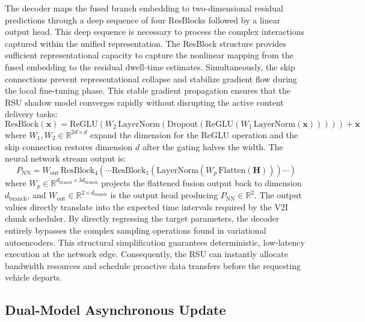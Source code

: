 \documentclass[journal]{IEEEtran}
\begin{document}
The decoder maps the fused branch embedding to two-dimensional residual predictions through a deep sequence of four ResBlocks followed by a linear output head.
This deep sequence is necessary to process the complex interactions captured within the unified representation.
The ResBlock structure provides sufficient representational capacity to capture the nonlinear mapping from the fused embedding to the residual dwell-time estimates.
Simultaneously, the skip connections prevent representational collapse and stabilize gradient flow during the local fine-tuning phase.
This stable gradient propagation ensures that the RSU shadow model converges rapidly without disrupting the active content delivery tasks:
\begin{equation}
\text{ResBlock}(\mathbf{x}) = \text{ReGLU}\!\left(W_2\, \text{LayerNorm}\!\left(\text{Dropout}\!\left(\text{ReGLU}(W_1\, \text{LayerNorm}(\mathbf{x}))\right)\right)\right) + \mathbf{x}
\label{eq:resblock}
\end{equation}
where $W_1, W_2 \in \mathbb{R}^{2d \times d}$ expand the dimension for the ReGLU operation and the skip connection restores dimension $d$ after the gating halves the width.
The neural network stream output is:
\begin{equation}
P_\text{NN} = W_\text{out}\, \text{ResBlock}_4\!\left(\cdots \text{ResBlock}_1\!\left(\text{LayerNorm}(W_p\, \text{Flatten}(\mathbf{H}))\right)\cdots\right)
\label{eq:decoder}
\end{equation}
where $W_p \in \mathbb{R}^{d_\text{branch} \times 3d_\text{branch}}$ projects the flattened fusion output back to dimension $d_\text{branch}$, and $W_\text{out} \in \mathbb{R}^{2 \times d_\text{branch}}$ is the output head producing $P_\text{NN} \in \mathbb{R}^2$.
The output values directly translate into the expected time intervals required by the V2I chunk scheduler.
By directly regressing the target parameters, the decoder entirely bypasses the complex sampling operations found in variational autoencoders.
This structural simplification guarantees deterministic, low-latency execution at the network edge.
Consequently, the RSU can instantly allocate bandwidth resources and schedule proactive data transfers before the requesting vehicle departs.

\subsection{Dual-Model Asynchronous Update}
\label{sec.prop.E}
\end{document}
